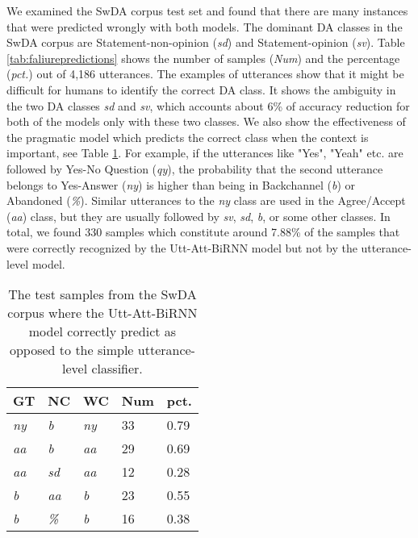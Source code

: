 \documentclass[a4paper]{article}
\begin{document}
We examined the SwDA corpus test set and found that there are many instances that were predicted wrongly with both models. 
The dominant DA classes in the SwDA corpus are Statement-non-opinion (\textit{sd}) and Statement-opinion (\textit{sv}).
Table \ref{tab:faliurepredictions} shows the number of samples (\textit{Num}) and the percentage (\textit{pct.}) out of 4,186 utterances. 
The examples of utterances show that it might be difficult for humans to identify the correct DA class. It shows the ambiguity in the two DA classes \textit{sd} and \textit{sv}, which accounts about 6\% of accuracy reduction for both of the models only with these two classes.
We also show the effectiveness of the pragmatic model which predicts the correct class when the context is important, see Table \ref{tab:correctpredictions}.
For example, if the utterances like "Yes", "Yeah" etc. are followed by Yes-No Question (\textit{qy}), the probability that the second utterance belongs to Yes-Answer (\textit{ny}) is higher than being in Backchannel (\textit{b}) or Abandoned (\textit{\%}). 
Similar utterances to the \textit{ny} class are used in the Agree/Accept (\textit{aa}) class, but they are usually followed by \textit{sv}, \textit{sd}, \textit{b}, or some other classes. 
In total, we found 330 samples which constitute around 7.88\% of the samples that were correctly recognized by the Utt-Att-BiRNN model but not by the utterance-level model. 


\begin{table}[b]
\centering
\caption{The test samples from the SwDA corpus where the Utt-Att-BiRNN model correctly predict as opposed to the simple utterance-level classifier.}
\label{tab:correctpredictions}
\begin{tabular}{lllll}
\toprule
\textbf{GT} & \textbf{NC} & \textbf{WC} & \textbf{Num} & \textbf{pct.} \\
\midrule
\textit{ny}  &  \textit{b}    &  \textit{ny}   & 33    &  0.79  \\
\textit{aa}  &  \textit{b}    &  \textit{aa}   & 29    &  0.69  \\
\textit{aa}  &  \textit{sd}   &  \textit{aa}   & 12    &  0.28  \\
\textit{b}   &  \textit{aa}   &  \textit{b}    & 23    &  0.55  \\
\textit{b}   &  \textit{\%}   &  \textit{b}    & 16    &  0.38  \\
\bottomrule
\end{tabular}
\end{table}
\end{document}
